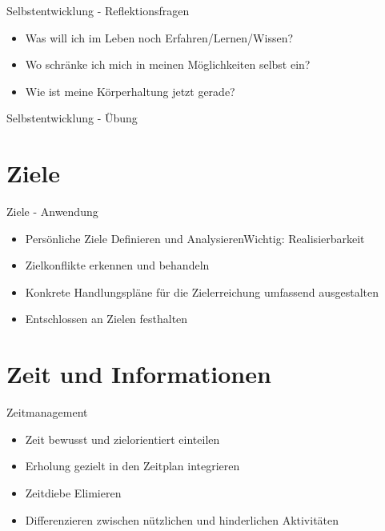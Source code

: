 \begin{frame}[c]{Selbstentwicklung - Reflektionsfragen}
    \begin{itemize}
    \item Was will ich im Leben noch Erfahren/Lernen/Wissen? \newline
    \pause
    \item Wo schränke ich mich in meinen Möglichkeiten selbst ein? \newline
    \pause
    \item Wie ist meine Körperhaltung jetzt gerade?
    \end{itemize}
\end{frame}


\begin{frame}[c]{Selbstentwicklung - Übung}
    
\end{frame}





\section{Ziele}

\begin{frame}[c]{Ziele - Anwendung}
    \begin{itemize}
    \item Persönliche Ziele Definieren und Analysieren\pause Wichtig: Realisierbarkeit
    \pause
    \item Zielkonflikte erkennen und behandeln
    \pause
    \item Konkrete Handlungspläne für die Zielerreichung umfassend ausgestalten
    \pause
    \item Entschlossen an Zielen festhalten
    \end{itemize}
\end{frame}





\section{Zeit und Informationen}

\begin{frame}[c]{Zeitmanagement}
    \begin{itemize}
    \item Zeit bewusst und zielorientiert einteilen
    \pause
    \item Erholung gezielt in den Zeitplan integrieren
    \pause
    \item Zeitdiebe Elimieren
    \pause
    \item Differenzieren zwischen nützlichen und hinderlichen Aktivitäten
    \end{itemize}
\end{frame}



